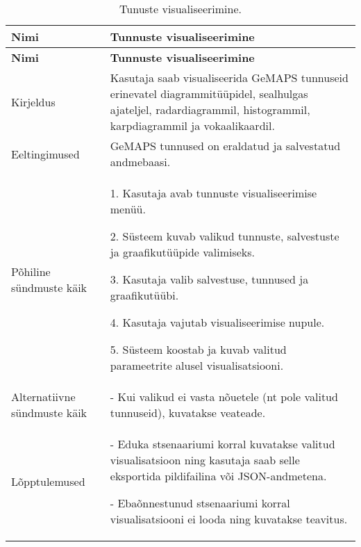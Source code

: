 \begin{longtable}{|p{2.5cm}|p{11cm}|}
    \caption{{Tunuste visualiseerimine.}}
    \label{tab:kasutusjuht3}\\ \hline
    \textbf{Nimi} &  \textbf{Tunnuste visualiseerimine}  \\
    \hline
    \endfirsthead
    \hline
    \textbf{Nimi} &  \textbf{Tunnuste visualiseerimine}  \\
    \hline
    \endhead
    \endfoot
    \hline
    \endlastfoot
    Kirjeldus & Kasutaja saab visualiseerida GeMAPS tunnuseid erinevatel diagrammitüüpidel, sealhulgas ajateljel, radardiagrammil, histogrammil, karpdiagrammil ja vokaalikaardil.\\ \hline
    Eeltingimused & GeMAPS tunnused on eraldatud ja salvestatud andmebaasi.\\ \hline
    Põhiline sündmuste käik & 
    1. Kasutaja avab tunnuste visualiseerimise menüü.
    
    2. Süsteem kuvab valikud tunnuste, salvestuste ja graafikutüüpide valimiseks.
    
    3. Kasutaja valib salvestuse, tunnused ja graafikutüübi.
    
    4. Kasutaja vajutab visualiseerimise nupule.
    
    5. Süsteem koostab ja kuvab valitud parameetrite alusel visualisatsiooni.
    \\ \hline
    Alternatiivne sündmuste käik & 
    - Kui valikud ei vasta nõuetele (nt pole valitud tunnuseid), kuvatakse veateade.
    \\ \hline
    Lõpptulemused & 
    - Eduka stsenaariumi korral kuvatakse valitud visualisatsioon ning kasutaja saab selle eksportida pildifailina või JSON-andmetena.
    
    - Ebaõnnestunud stsenaariumi korral visualisatsiooni ei looda ning kuvatakse teavitus.
    \\ \hline
\end{longtable}


